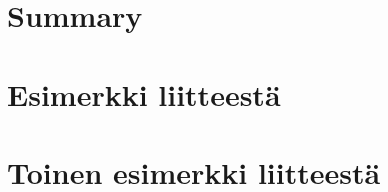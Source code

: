 \clearpage

\section{Summary} 


\clearpage

\thesisbibliography
\printbibliography
%
%
%

\clearpage

\thesisappendix

\section{Esimerkki liitteest\"a\label{LiiteA}}



\clearpage
\section{Toinen esimerkki liitteest\"a\label{LiiteB}}




